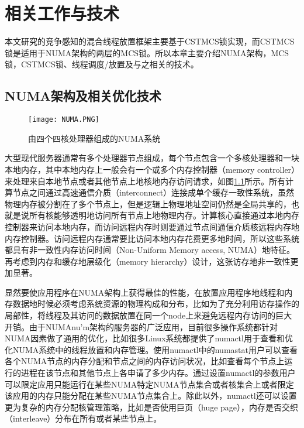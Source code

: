 
\chapter{相关工作与技术}
\label{chap:example}
本文研究的竞争感知的混合线程放置框架主要基于CSTMCS锁实现，而CSTMCS锁是适用于NUMA架构的两层的MCS锁。所以本章主要介绍NUMA架构，MCS锁，CSTMCS锁、线程调度/放置及与之相关的技术。

\section{NUMA架构及相关优化技术}
\begin{figure}[t]
	\centering
	\texttt{[image: NUMA.PNG]}
	\caption{由四个四核处理器组成的NUMA系统}
	\label{Fig:numa}
\end{figure}
大型现代服务器通常有多个处理器节点组成，每个节点包含一个多核处理器和一块本地内存，其中本地内存上一般会有一个或多个内存控制器（memory controller）来处理来自本地节点或者其他节点上地核地内存访问请求，如图\ref{Fig:numa}所示。所有计算节点之间通过高速通信介质（interconnect）连接成单个缓存一致性系统，虽然物理内存被分割在了多个节点上，但是逻辑上物理地址空间仍然是全局共享的，也就是说所有核能够透明地访问所有节点上地物理内存。计算核心直接通过本地内存控制器来访问本地内存，而访问远程内存时则要通过节点间通信介质核远程内存地内存控制器。访问远程内存通常要比访问本地内存花费更多地时间，所以这些系统都具有非一致性内存访问时间（Non-Uniform Memory access, NUMA）地特征。再考虑到内存和缓存地层级化（memory hierarchy）设计，这张访存地非一致性更加显著。

显然要使应用程序在NUMA架构上获得最佳的性能，在放置应用程序地线程和内存数据地时候必须考虑系统资源的物理构成和分布，比如为了充分利用访存操作的局部性，将线程及其访问的数据放置在同一个node上来避免远程内存访问的巨大开销。由于NUMAnu'm架构的服务器的广泛应用，目前很多操作系统都针对NUMA因素做了通用的优化，比如很多Linux系统都提供了numactl用于查看和优化NUMA系统中的线程放置和内存管理。使用numactl中的numastat用户可以查看各个NUMA节点的内存分配和节点之间的内存访问状况，比如查看每个节点上运行的进程在该节点和其他节点上各申请了多少内存。通过设置numactl的参数用户可以限定应用只能运行在某些NUMA特定NUMA节点集合或者核集合上或者限定该应用的内存只能分配在某些NUMA节点集合上。除此以外，numactl还可以设置更为复杂的内存分配核管理策略，比如是否使用巨页（huge page），内存是否交织（interleave）分布在所有或者某些节点上。

